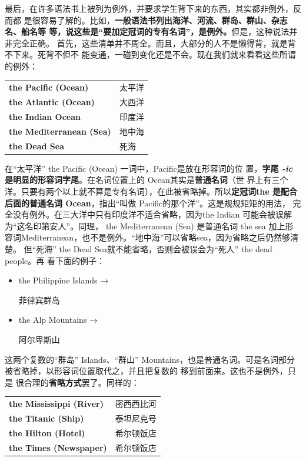 最后，在许多语法书上被列为例外，并要求学生背下来的东西，其实都非例外，反而都
是很容易了解的。比如，\textbf{一般语法书列出海洋、河流、群岛、群山、杂志名、船名等
  等，说这些是“要加定冠词的专有名词”，是例外。}但是，这种说法并非完全正确。
首先，这些清单并不周全。而且，大部分的人不是懒得背，就是背不下来。死背不但不
能变通，一碰到变化还是不会。现在我们就来看看这些所谓的例外：

\begin{longtable}[]{@{}ll@{}}
  \textbf{the Pacific (Ocean)} & 太平洋 \\
  \textbf{the Atlantic (Ocean)} & 大西洋 \\
  \textbf{the Indian Ocean} & 印度洋 \\
  \textbf{the Mediterranean (Sea)} & 地中海 \\
  \textbf{the Dead Sea} & 死海 \\
\end{longtable}

在“太平洋” the Pacific (Ocean) 一词中，Pacific是放在形容词的位
置，\textbf{字尾 \emph{-ic} 是明显的形容词字尾}。在名词位置上的 Ocean其实是\textbf{普通名词}（世
界上有三个洋。只要有两个以上就不算是专有名词），在此被省略掉。所以\textbf{定冠词the
  是配合后面的普通名词 Ocean}，指出“叫做 Pacific的那个洋”。这是规规矩矩的用法，
完全没有例外。在三大洋中只有印度洋不适合省略，因为the Indian 可能会被误解
为“这名印第安人”。同理， the Mediterranean (Sea) 是普通名词 the sea 加上形
容词Mediterranean，也不是例外。“地中海”可以省略sea，因为省略之后仍然够清楚。
但“死海” the Dead Sea就不能省略，否则会被误会为“死人” the dead people。再
看下面的例子：

\begin{itemize}
\item  the Philippine Islands → 

菲律宾群岛
\item  the Alp Mountains → 

阿尔卑斯山
\end{itemize}

这两个复数的“群岛” Islands、“群山” Mountains，也是普通名词。可是名词部分
被省略掉，以形容词位置取代之，并且把复数的  移到前面来。这也不是例外，只是
很合理的\textbf{省略方式}罢了。同样的：

\begin{longtable}[]{@{}ll@{}}
  \textbf{the Mississippi (River)} & 密西西比河 \\
  \textbf{the Titanic (Ship)} & 泰坦尼克号 \\
  \textbf{the Hilton (Hotel)} & 希尔顿饭店 \\
  \textbf{the Times (Newspaper)} & 希尔顿饭店 \\
\end{longtable}

